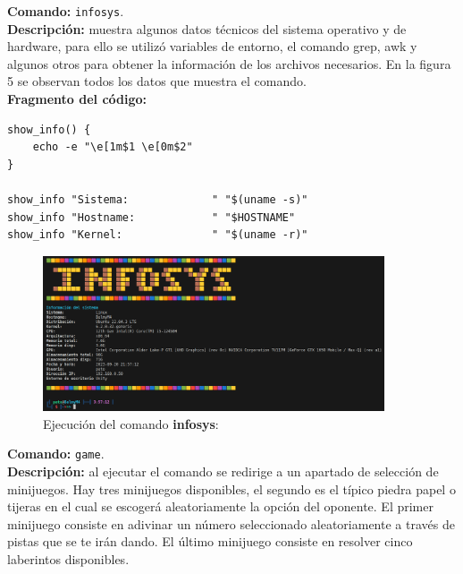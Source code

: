\documentclass[titlepage]{article}
\begin{document}
\newpage
\noindent
\textbf{Comando:} \verb|infosys|. \\
\textbf{Descripción:} muestra algunos datos técnicos del sistema operativo y de hardware, para ello se utilizó variables de entorno, el comando grep, awk y algunos otros para obtener la información de los archivos necesarios. En la figura 5 se observan todos los datos que muestra el comando.\\

\noindent
\textbf{Fragmento del código:}
\begin{lstlisting}
show_info() {
    echo -e "\e[1m$1 \e[0m$2"
}

show_info "Sistema:             " "$(uname -s)"
show_info "Hostname:            " "$HOSTNAME"
show_info "Kernel:              " "$(uname -r)"

\end{lstlisting}

\begin{figure}[H]
    \centering
    \includegraphics[width=0.9\textwidth]{infosys.png}
    \caption{Ejecución del comando \textbf{infosys}:}
    \label{fig:ejemplo}
\end{figure}

\newpage
\noindent
\textbf{Comando:} \verb|game|. \\
\textbf{Descripción:} al ejecutar el comando se redirige a un apartado de selección de minijuegos. Hay tres minijuegos disponibles, el segundo es el típico piedra papel o tijeras en el cual se escogerá aleatoriamente la opción del oponente. El primer minijuego consiste en adivinar un número seleccionado aleatoriamente a través de pistas que se te irán dando. El último minijuego consiste en resolver cinco laberintos disponibles. 
\end{document}
